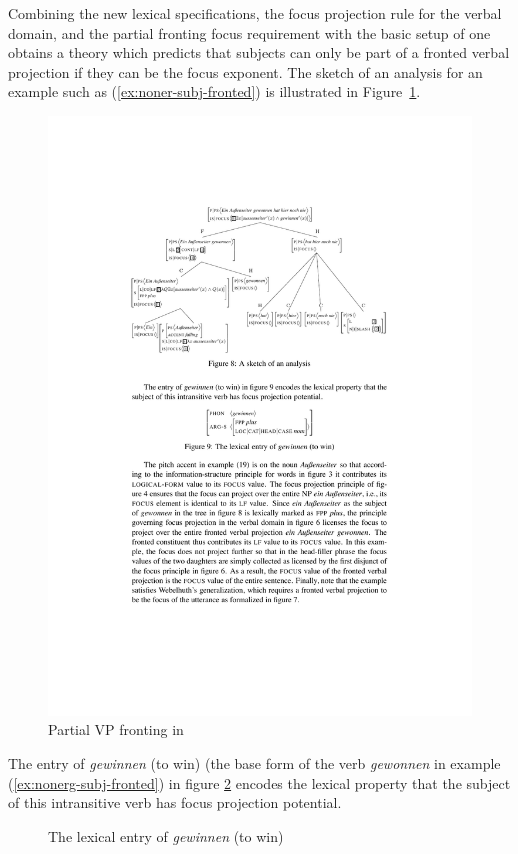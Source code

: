 \documentclass[output=paper]{langsci/langscibook}
\begin{document}
Combining the new lexical specifications, the focus projection rule
for the verbal domain, and the partial fronting focus requirement with
the basic setup of \cite{deKuthy2002a} one obtains a theory which
predicts that subjects can only be part of a fronted verbal projection
if they can be the focus exponent. The sketch of an analysis for an
example such as (\ref{ex:noner-subj-fronted}) is illustrated in
Figure~\ref{fig:focus-exponent}.
  \begin{figure}[htb]
    \centering
    \includegraphics[scale=0.9]{figures/vp-focus-exponent}
    \caption{Partial VP fronting in \cite{dKM2003a}}
    \label{fig:focus-exponent}
  \end{figure}
  The entry of \textit{gewinnen} (to win) (the base form of the verb
  \textit{gewonnen} in example (\ref{ex:nonerg-subj-fronted}) in
  figure \ref{fig:lex-entry} encodes the lexical property that the
  subject of this intransitive verb has focus projection potential.
\begin{figure}[htb!]
%
\begin{center}
  \begin{avm}
  \end{avm}
\caption{The lexical entry of \textit{gewinnen} (to win)}
\label{fig:lex-entry}
\end{center}\unskip
\end{figure}
\end{document}
